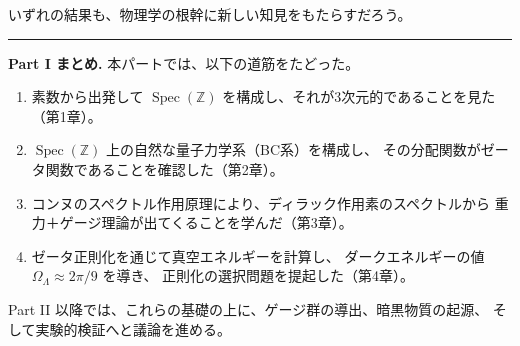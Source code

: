 \documentclass[11pt,a4paper]{article}
\theoremstyle{definition}
\newcommand{\Z}{\mathbb{Z}}
\newcommand{\Spec}{\operatorname{Spec}}
\begin{document}
いずれの結果も、物理学の根幹に新しい知見をもたらすだろう。

\vspace{2em}
\begin{center}
  \rule{0.4\textwidth}{0.4pt}
\end{center}
\vspace{1em}

\noindent\textbf{Part I まとめ.}
本パートでは、以下の道筋をたどった。

\begin{enumerate}
  \item 素数から出発して $\Spec(\Z)$ を構成し、それが3次元的であることを見た（第1章）。
  \item $\Spec(\Z)$ 上の自然な量子力学系（BC系）を構成し、
        その分配関数がゼータ関数であることを確認した（第2章）。
  \item コンヌのスペクトル作用原理により、ディラック作用素のスペクトルから
        重力＋ゲージ理論が出てくることを学んだ（第3章）。
  \item ゼータ正則化を通じて真空エネルギーを計算し、
        ダークエネルギーの値 $\Omega_\Lambda \approx 2\pi/9$ を導き、
        正則化の選択問題を提起した（第4章）。
\end{enumerate}

Part II 以降では、これらの基礎の上に、ゲージ群の導出、暗黒物質の起源、
そして実験的検証へと議論を進める。
\end{document}
